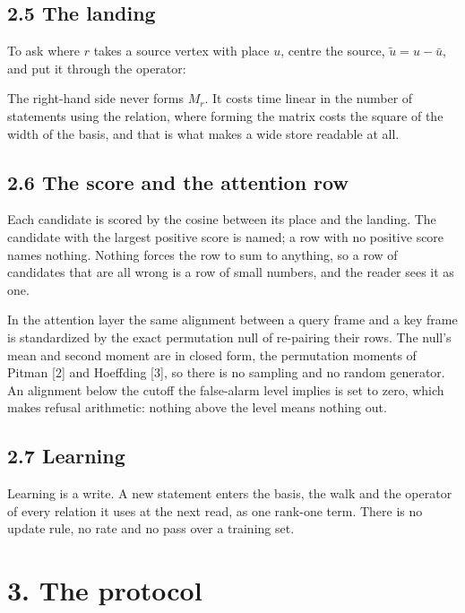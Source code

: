 \documentclass[10pt,letterpaper,twocolumn]{article}
\begin{document}
\subsection{2.5 The landing}\label{25-the-landing}

To ask where \(r\) takes a source vertex with place \(u\), centre the source, \(\tilde{u} = u - \bar{u}\),
and put it through the operator:


The right-hand side never forms \(M_r\). It costs time linear in the number of statements using the
relation, where forming the matrix costs the square of the width of the basis, and that is what makes
a wide store readable at all.

\subsection{2.6 The score and the attention row}\label{26-the-score-and-the-attention-row}

Each candidate is scored by the cosine between its place and the landing. The candidate with the
largest positive score is named; a row with no positive score names nothing. Nothing forces the row
to sum to anything, so a row of candidates that are all wrong is a row of small numbers, and the
reader sees it as one.

In the attention layer the same alignment between a query frame and a key frame is standardized by
the exact permutation null of re-pairing their rows. The null's mean and second moment are in closed
form, the permutation moments of Pitman {[}2{]} and Hoeffding {[}3{]}, so there is no sampling and no random
generator. An alignment below the cutoff the false-alarm level implies is set to zero, which makes
refusal arithmetic: nothing above the level means nothing out.

\subsection{2.7 Learning}\label{27-learning}

Learning is a write. A new statement enters the basis, the walk and the operator of every relation
it uses at the next read, as one rank-one term. There is no update rule, no rate and no pass over a
training set.

\section{3. The protocol}\label{3-the-protocol}
\end{document}

